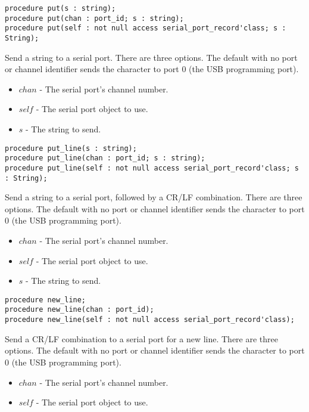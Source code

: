 \documentclass[10pt, openany]{book}
\newcommand{\indexfunc}[1]{\index[func]{#1}}
\begin{document}
\begin{lstlisting}
procedure put(s : string);
procedure put(chan : port_id; s : string);
procedure put(self : not null access serial_port_record'class; s : String);
\end{lstlisting}
\indexfunc{put}
Send a string to a serial port.  There are three options.  The default with no port or channel identifier sends the character to port 0 (the USB programming port).
\begin{itemize}
  \item $chan$ - The serial port's channel number.
  \item $self$ - The serial port object to use.
  \item $s$ - The string to send.
\end{itemize}

\begin{lstlisting}
procedure put_line(s : string);
procedure put_line(chan : port_id; s : string);
procedure put_line(self : not null access serial_port_record'class; s : String);
\end{lstlisting}
\indexfunc{put\_line}
Send a string to a serial port, followed by a CR/LF combination.  There are three options.  The default with no port or channel identifier sends the character to port 0 (the USB programming port).
\begin{itemize}
  \item $chan$ - The serial port's channel number.
  \item $self$ - The serial port object to use.
  \item $s$ - The string to send.
\end{itemize}

\begin{lstlisting}
procedure new_line;
procedure new_line(chan : port_id);
procedure new_line(self : not null access serial_port_record'class);
\end{lstlisting}
\indexfunc{new\_line}
Send a CR/LF combination to a serial port for a new line.  There are three options.  The default with no port or channel identifier sends the character to port 0 (the USB programming port).
\begin{itemize}
  \item $chan$ - The serial port's channel number.
  \item $self$ - The serial port object to use.
\end{itemize}
\end{document}
